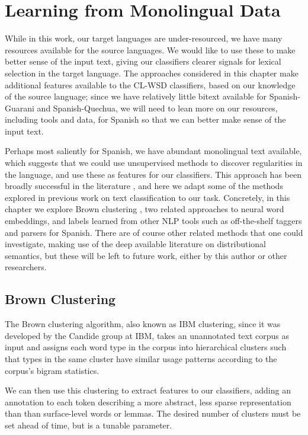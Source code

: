 \chapter{Learning from Monolingual Data}
\label{chap:monolingual}
While in this work, our target languages are under-resourced, we have many
resources available for the source languages. We would like to use these to
make better sense of the input text, giving our classifiers clearer signals for
lexical selection in the target language.
The approaches considered in this chapter make additional features available to
the CL-WSD classifiers, based on our knowledge of the source language;
since we have relatively little bitext available for Spanish-Guarani
and Spanish-Quechua, we will need to lean more on our resources, including
tools and data, for Spanish so that we can better make sense of the input text.

Perhaps most saliently for Spanish, we have abundant monolingual text
available, which suggests that we could use unsupervised methods to discover
regularities in the language, and use these as features for our classifiers.
This approach has been broadly successful in the literature
\cite{turian-ratinov-bengio:2010:ACL}
, and here we adapt some of the methods explored in previous work on text
classification to our task. Concretely, in this chapter we explore Brown
clustering \cite{brown1992class}, two related approaches to neural word
embeddings, and labels learned from other NLP tools such as off-the-shelf
taggers and parsers for Spanish.  There are of course other related methods
that one could investigate, making use of the deep available literature on
distributional semantics, but these will be left to future work, either by this
author or other researchers.

\section{Brown Clustering}
The Brown clustering algorithm, also known as IBM clustering, since it was
developed by the Candide group at IBM, takes an unannotated text corpus as
input and assigns each word type in the corpus into hierarchical clusters such
that types in the same cluster have similar usage patterns according to the
corpus's bigram statistics.

We can then use this clustering to extract features to our classifiers, adding
an annotation to each token describing a more abstract, less sparse
representation than than surface-level words or lemmas. The desired
number of clusters must be set ahead of time, but is a tunable parameter.

